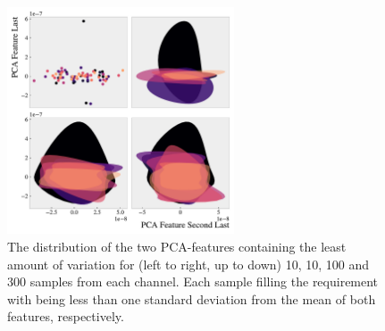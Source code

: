 \begin{figure}
    \centering
    \includegraphics[width=0.6\textwidth]{Figures/MLResults/DataHandling/PCA/PCAPlotLast.pdf}
    \caption[The value distribution of the two last PCA-features.]{The distribution of the two PCA-features containing the least amount of variation for (left to right, 
    up to down) 10, 10, 100 and 300 samples from each channel. Each sample filling the requirement 
    with being less than one standard deviation from the mean of both features, respectively.}
    \label{fig:PCA2}
\end{figure}


